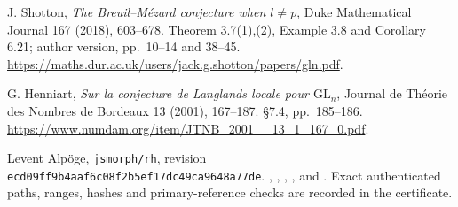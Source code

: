 J. Shotton, \emph{The Breuil--M\'ezard conjecture when \(l\ne p\)},
Duke Mathematical Journal 167 (2018), 603--678.
Theorem 3.7(1),(2), Example 3.8 and Corollary 6.21;
author version, pp.~10--14 and 38--45.
\url{https://maths.dur.ac.uk/users/jack.g.shotton/papers/gln.pdf}.

G. Henniart, \emph{Sur la conjecture de Langlands locale pour
\(\mathrm{GL}_n\)},
Journal de Th\'eorie des Nombres de Bordeaux 13 (2001), 167--187.
\S7.4, pp.~185--186.
\url{https://www.numdam.org/item/JTNB_2001__13_1_167_0.pdf}.

Levent Alp\"oge, \texttt{jsmorph/rh},
revision \texttt{ecd09ff9b4aaf6c08f2b5ef17dc49ca9648a77de}.
,
,
,
,
and .
Exact authenticated paths, ranges, hashes and primary-reference checks
are recorded in the
 certificate.
